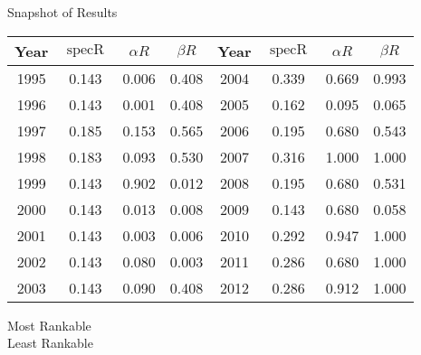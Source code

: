 \documentclass{beamer}
\DeclareMathOperator{\specR}{specR}
\begin{document}
\begin{frame}{Snapshot of Results}
\centering
\begin{tabular}{|| c | c | c | c || c | c | c | c ||}
\hline
Year & $\specR$ & $\alpha R$ & $\beta R$ & Year & $\specR$ & $\alpha R$ & $\beta R$ \\
\hline\hline
1995 & 0.143 & 0.006 & 0.408 & 2004 & 0.339 & 0.669 & 0.993 \\ 
1996 & 0.143 & 0.001 & 0.408 & 2005 & 0.162 & 0.095 & 0.065 \\
1997 & 0.185 & 0.153 & 0.565 & 2006 & 0.195 & 0.680 & 0.543 \\
1998 & 0.183 & 0.093 & 0.530 & 2007 & 0.316 & 1.000 & 1.000 \\
1999 & 0.143 & 0.902 & 0.012 & 2008 & 0.195 & 0.680 & 0.531 \\
2000 & 0.143 & 0.013 & 0.008 & 2009 & 0.143 & 0.680 & 0.058 \\
2001 & 0.143 & 0.003 & 0.006 & 2010 & 0.292 & 0.947 & 1.000 \\
2002 & 0.143 & 0.080 & 0.003 & 2011 & 0.286 & 0.680 & 1.000 \\
2003 & 0.143 & 0.090 & 0.408 & 2012 & 0.286 & 0.912 & 1.000 \\
\hline
\end{tabular}
\vfill
{}\quad Most Rankable\\
\vfill
{}\quad Least Rankable\\
\end{frame}
\end{document}

